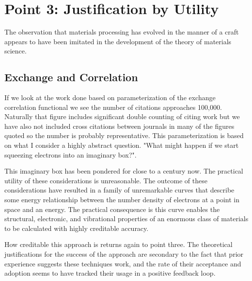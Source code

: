 \section{Point 3: Justification by Utility}
The observation that materials processing has evolved in the manner 
of a craft appears to have been imitated in the development of the 
theory of materials science.

\subsection{Exchange and Correlation}
If we look at the work done based on parameterization of the exchange correlation functional 
we see the number of citations approaches 100,000. Naturally that figure includes significant 
double counting of citing work but we have also not included cross citations between journals in many of the 
figures quoted so the number is probably representative. This parameterization is based on 
what I consider a highly abstract question. "What might happen if we start squeezing electrons into an imaginary box?".

This imaginary box has been pondered for close to a century now. The practical utility of these considerations is unreasonable. 
The outcome of these considerations have resulted in a family of unremarkable curves that describe some energy relationship between
the number density of electrons at a point in space and an energy. The practical consequence is this curve enables the
structural, electronic, and vibrational properties of an enormous class of materials to be calculated with highly creditable accuracy.

How creditable this approach is returns again to point three. The theoretical justifications for the success of the approach are
secondary to the fact that prior experience suggests these techniques work, and the rate of their acceptance and adoption
seems to have tracked their usage in a positive feedback loop. 


